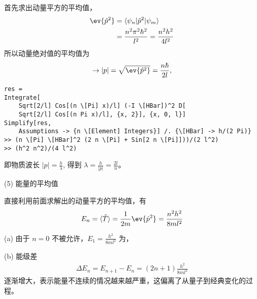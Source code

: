 首先求出动量平方的平均值，
\begin{align}
    \ev{\hat p^2} &= \langle \psi_n | \hat p^2 | \psi_m \rangle \\
    &= \frac{n^2\pi^2\hbar^2}{l^2} = \frac{n^2h^2}{4 l^2}
\end{align}
所以动量绝对值的平均值为
\begin{align}
    \rightarrow |p| = \sqrt{\ev{\hat p^2}} = \frac{n\hbar}{2l},
\end{align}
\begin{lstlisting}
res = 
Integrate[
    Sqrt[2/l] Cos[(n \[Pi] x)/l] (-I \[HBar])^2 D[
    Sqrt[2/l] Cos[(n Pi x)/l], {x, 2}], {x, 0, l}]
Simplify[res, 
    Assumptions -> {n \[Element] Integers}] /. {\[HBar] -> h/(2 Pi)}
>> (n \[Pi] \[HBar]^2 (2 n \[Pi] + Sin[2 n \[Pi]]))/(2 l^2)
>> (h^2 n^2)/(4 l^2)
\end{lstlisting}
即物质波长 $|p| = \frac{h}{\lambda}$, 得到 $\lambda = \frac h{|p|} = \frac{2l}n$。 


(5) 能量的平均值

直接利用前面求解出的动量平方的平均值，有
\begin{align}
    E_n = \langle \hat T \rangle = \frac1{2m} \ev{\hat p^2} = 
    \frac{n^2h^2}{8ml^2}
\end{align}

(a) 由于 $n=0$ 不被允许，$E_1 = \frac{h^2}{8ml^2}$ 为，

(b) 能级差
\begin{align}
    \Delta E_n = E_{n+1} - E_n = (2n+1) \frac{h^2}{8ml^2}
\end{align}
逐渐增大，表示能量不连续的情况越来越严重，这偏离了从量子到经典变化的过程。


